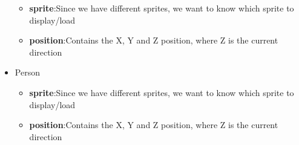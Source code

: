 \documentclass[12pt]{article}
\begin{document}
\begin{itemize}
			\begin{itemize}				
				\item \textbf{sprite}:\quad Since we have different sprites, we want to know which sprite to display/load
				\item \textbf{position}:\quad Contains the X, Y and Z position, where Z is the current direction
			\end{itemize}
		\item Person
			\begin{itemize}				
				\item \textbf{sprite}:\quad Since we have different sprites, we want to know which sprite to display/load
				\item \textbf{position}:\quad Contains the X, Y and Z position, where Z is the current direction
			\end{itemize}
	\end{itemize}
\end{document}
